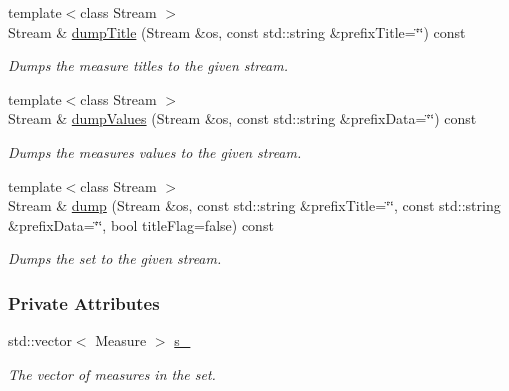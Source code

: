 \begin{DoxyCompactItemize}
{\footnotesize template$<$class Stream $>$ }\\Stream \& \hyperlink{structslb_1_1core_1_1sb_1_1MeasureSet_aafe9196d39cc271c4f5b0cae32569a61}{dump\+Title} (Stream \&os, const std\+::string \&prefix\+Title=\char`\"{}\char`\"{}) const 
\begin{DoxyCompactList}\small\item\em Dumps the measure titles to the given stream. \end{DoxyCompactList}\item 
{\footnotesize template$<$class Stream $>$ }\\Stream \& \hyperlink{structslb_1_1core_1_1sb_1_1MeasureSet_ab5dd4d0eefc6d870c74a9b3a4ae4fd44}{dump\+Values} (Stream \&os, const std\+::string \&prefix\+Data=\char`\"{}\char`\"{}) const 
\begin{DoxyCompactList}\small\item\em Dumps the measures\textquotesingle{} values to the given stream. \end{DoxyCompactList}\item 
{\footnotesize template$<$class Stream $>$ }\\Stream \& \hyperlink{structslb_1_1core_1_1sb_1_1MeasureSet_a089091b9cb7526255748987baea8f0d7}{dump} (Stream \&os, const std\+::string \&prefix\+Title=\char`\"{}\char`\"{}, const std\+::string \&prefix\+Data=\char`\"{}\char`\"{}, bool title\+Flag=false) const 
\begin{DoxyCompactList}\small\item\em Dumps the set to the given stream. \end{DoxyCompactList}\end{DoxyCompactItemize}
\subsubsection*{Private Attributes}
\begin{DoxyCompactItemize}
\item 
std\+::vector$<$ Measure $>$ \hyperlink{structslb_1_1core_1_1sb_1_1MeasureSet_a24a9be92f84b8cab38d15c61dd077951}{s\+\_\+}\hypertarget{structslb_1_1core_1_1sb_1_1MeasureSet_a24a9be92f84b8cab38d15c61dd077951}{}\label{structslb_1_1core_1_1sb_1_1MeasureSet_a24a9be92f84b8cab38d15c61dd077951}

\begin{DoxyCompactList}\small\item\em The vector of measures in the set. \end{DoxyCompactList}\end{DoxyCompactItemize}


